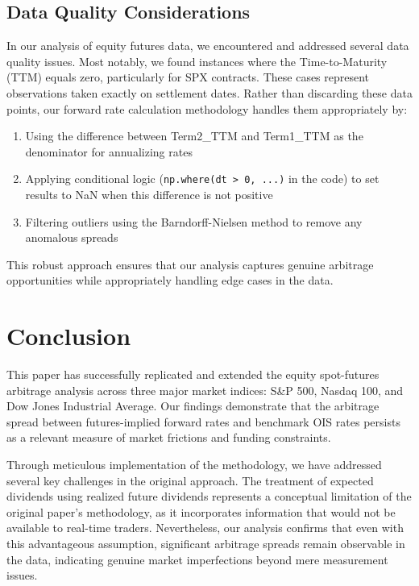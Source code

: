 \documentclass{article}
\begin{document}
\subsection{Data Quality Considerations}

In our analysis of equity futures data, we encountered and addressed several data quality issues. Most notably, we found instances where the Time-to-Maturity (TTM) equals zero, particularly for SPX contracts. These cases represent observations taken exactly on settlement dates. Rather than discarding these data points, our forward rate calculation methodology handles them appropriately by:

\begin{enumerate}
  \item Using the difference between Term2\_TTM and Term1\_TTM as the denominator for annualizing rates
  \item Applying conditional logic (\texttt{np.where(dt > 0, ...)} in the code) to set results to NaN when this difference is not positive
  \item Filtering outliers using the Barndorff-Nielsen method to remove any anomalous spreads
\end{enumerate}

This robust approach ensures that our analysis captures genuine arbitrage opportunities while appropriately handling edge cases in the data.

\section{Conclusion}
This paper has successfully replicated and extended the equity spot-futures arbitrage analysis across three major market indices: S\&P 500, Nasdaq 100, and Dow Jones Industrial Average. Our findings demonstrate that the arbitrage spread between futures-implied forward rates and benchmark OIS rates persists as a relevant measure of market frictions and funding constraints.

Through meticulous implementation of the methodology, we have addressed several key challenges in the original approach. The treatment of expected dividends using realized future dividends represents a conceptual limitation of the original paper's methodology, as it incorporates information that would not be available to real-time traders. Nevertheless, our analysis confirms that even with this advantageous assumption, significant arbitrage spreads remain observable in the data, indicating genuine market imperfections beyond mere measurement issues.
\end{document}
